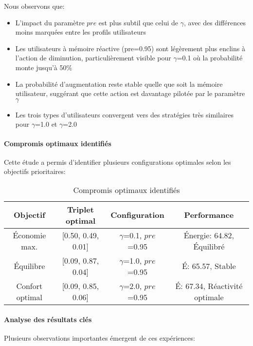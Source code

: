 Nous observons que: 
\begin{itemize} 
    \item L'impact du paramètre $pre$ est plus subtil que celui de $\gamma$, avec des différences moins marquées entre les profils utilisateurs
    \item Les utilisateurs à mémoire réactive (pre=0.95) sont légèrement plus enclins à l'action de diminution, particulièrement visible pour $\gamma$=0.1 où la probabilité monte jusqu'à 50\%
    \item La probabilité d'augmentation reste stable quelle que soit la mémoire utilisateur, suggérant que cette action est davantage pilotée par le paramètre $\gamma$
    \item Les trois types d'utilisateurs convergent vers des stratégies très similaires pour $\gamma$=1.0 et $\gamma$=2.0
\end{itemize}

\paragraph{Compromis optimaux identifiés}

Cette étude a permis d'identifier plusieurs configurations optimales selon les objectifs prioritaires:

\begin{table}[h]
\centering
\footnotesize
\setlength{\tabcolsep}{4pt}
\begin{tabular}{|c|c|c|c|}
\hline
\textbf{Objectif} & \textbf{Triplet optimal} & \textbf{Configuration} & \textbf{Performance} \\
\hline
Économie max. & [0.50, 0.49, 0.01] & $\gamma$=0.1, $pre$=0.95 & Énergie: 64.82, Équilibré \\
\hline
Équilibre & [0.09, 0.87, 0.04] & $\gamma$=1.0, $pre$=0.95 & É: 65.57, Stable \\
\hline
Confort optimal & [0.09, 0.85, 0.06] & $\gamma$=2.0, $pre$=0.95 & É: 67.34, Réactivité optimale \\
\hline
\end{tabular}
\caption{Compromis optimaux identifiés}
\label{tab:compromis_optimaux}
\end{table}

\paragraph{Analyse des résultats clés}

Plusieurs observations importantes émergent de ces expériences:

